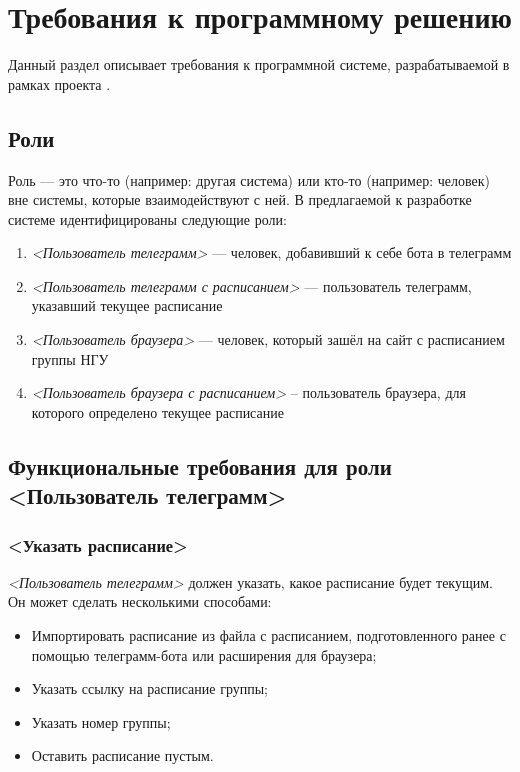 \newcommand{\actor}[1]{\textit{#1}}

\chapter{Требования к программному решению}
	\label{chapter3}

	Данный раздел описывает требования к программной системе, разрабатываемой в рамках проекта \ProjectName.
		
	\section{Роли}
		Роль --- это что-то (например: другая система) или кто-то (например: человек) вне системы, которые взаимодействуют с ней. В предлагаемой к разработке системе идентифицированы следующие роли:
		\begin{enumerate}
			\item \actor{<Пользователь телеграмм>} --- человек, добавивший к себе бота в телеграмм
			
			\item \actor{<Пользователь телеграмм с расписанием>} --- пользователь телеграмм, указавший текущее расписание
			
			\item \actor{<Пользователь браузера>} --- человек, который зашёл на сайт с расписанием группы НГУ
			
			\item \actor{<Пользователь браузера с расписанием>} -- пользователь браузера, для которого определено текущее расписание
		\end{enumerate}
	\section{Функциональные требования для роли <Пользователь телеграмм>}
		\subsection{<Указать расписание>}
			\actor{<Пользователь телеграмм>} должен указать, какое расписание будет текущим. Он может сделать несколькими способами:
			\begin{itemize}
				\item Импортировать расписание из файла с расписанием, подготовленного ранее с помощью телеграмм-бота или расширения для браузера;
				
				\item Указать ссылку на расписание группы;
				
				\item Указать номер группы;
				
				\item Оставить расписание пустым.
			\end{itemize}
